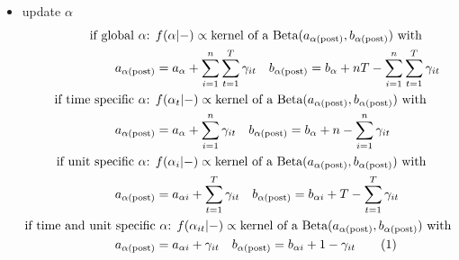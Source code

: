 \documentclass[12pt,	%
	a4paper,		%
	twoside,		%
	openright,		%
	titlepage,%
	]{book}
\newcommand\numberthis{\addtocounter{equation}{1}\tag{\theequation}}
\theoremstyle{definition}
\begin{document}
\begin{itemize}
\item update $\alpha$
\begin{align*}
    \text{if global $\alpha$: } & f(\alpha|-)\propto \text{kernel of a $\Beta(a_{\postp{\alpha}},b_{\postp{\alpha}})$ with}\\
    a_{\postp{\alpha}} &= a_\alpha+\sum_{i=1}^n \sum_{t=1}^T \gamma_{it} \quad
    b_{\postp{\alpha}} = b_\alpha+nT-\sum_{i=1}^n \sum_{t=1}^T \gamma_{it}\\
    \text{if time specific $\alpha$: } & f(\alpha_t|-)\propto \text{kernel of a $\Beta(a_{\postp{\alpha}},b_{\postp{\alpha}})$ with}\\
    a_{\postp{\alpha}} &= a_\alpha+\sum_{i=1}^n \gamma_{it} \quad
    b_{\postp{\alpha}} = b_\alpha+n-\sum_{i=1}^n \gamma_{it}\\
    \text{if unit specific $\alpha$: } & f(\alpha_i|-)\propto \text{kernel of a $\Beta(a_{\postp{\alpha}},b_{\postp{\alpha}})$ with}\\
    a_{\postp{\alpha}} &= a_{\alpha i}+\sum_{t=1}^T \gamma_{it} \quad
    b_{\postp{\alpha}} = b_{\alpha i}+T-\sum_{t=1}^T \gamma_{it}\\
    \text{if time and unit specific} & \text{ $\alpha$: } f(\alpha_{it}|-)\propto \text{kernel of a $\Beta(a_{\postp{\alpha}},b_{\postp{\alpha}})$ with}\\
    a_{\postp{\alpha}} &= a_{\alpha i}+\gamma_{it} \quad
    b_{\postp{\alpha}} = b_{\alpha i}+1- \gamma_{it}
    \numberthis \label{update alpha}
\end{align*}


\end{itemize}
\end{document}
